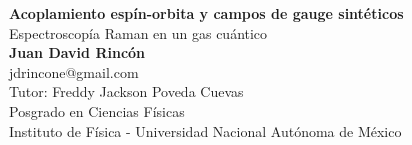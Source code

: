 \documentclass[superscriptaddress,onecolumn,aps,preprint,showpacs,nofootinbib,pra,11pt]{revtex4-2}
\begin{document}

	\begin{center}
    
    
		\Large{\textbf{Acoplamiento espín-orbita y campos de gauge sint\'{e}ticos}}\\
        \vspace{-0.2em}
        \Large{Espectroscop\'{i}a Raman en un gas cu\'{a}ntico} \\
        \vspace{0.5em}
        \normalsize\textbf{Juan David Rincón} \\
        \vspace{-0.5em}
        \normalsize{jdrincone@gmail.com} \\
        \vspace{0.5em}
        \normalsize{Tutor: Freddy Jackson Poveda Cuevas} \\
        \vspace{0.5em}
        \normalsize{Posgrado en Ciencias Físicas} \\
        \vspace{-0.5em}
        \normalsize{Instituto de Física - Universidad Nacional Autónoma de México}\\
     
	\end{center}
	
\end{document}
